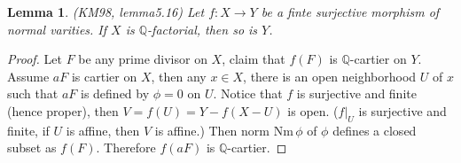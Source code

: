 \documentclass{article}
\newtheorem{lem}[defn]{Lemma}
\begin{document}
\begin{lem}
	(KM98, lemma5.16) Let $ f:X\to Y $ be a finte surjective morphism of normal varities. If $ X $ is $ \mathbb{Q} $-factorial, then so is $ Y $.
\end{lem}
\begin{proof}
	Let $ F $ be any prime divisor on $ X $, claim that $ f(F) $ is $ \mathbb{Q} $-cartier on $ Y $. Assume $ aF $ is cartier on $ X $, then any $ x\in X $, there is an open neighborhood $ U $ of $ x $ such that $ aF$ is defined by $ \phi=0 $ on $ U $. Notice that $ f $ is surjective and finite (hence proper), then $ V=f(U)=Y-f(X-U) $ is open. ($ f|_U $ is surjective and finite, if $ U $ is affine, then $ V $ is affine.) Then norm $ \mathrm{Nm}\, \phi $ of $ \phi $ defines a closed subset as $ f(F) $. Therefore $ f(aF) $ is $ \mathbb{Q} $-cartier. 
\end{proof}
\end{document}
